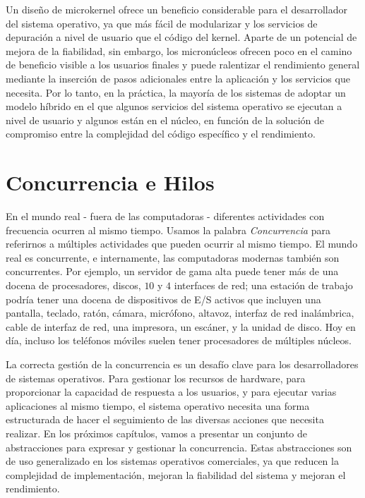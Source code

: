 \documentclass[10pt]{book}
\begin{document}
Un diseño de microkernel ofrece un beneficio considerable para el desarrollador del sistema operativo, ya que más fácil de modularizar y los servicios de depuración a nivel de usuario que el código del kernel. Aparte de un potencial de mejora de la fiabilidad, sin embargo, los micronúcleos ofrecen poco en el camino de beneficio visible a los usuarios finales y puede ralentizar el rendimiento general mediante la inserción de pasos adicionales entre la aplicación y los servicios que necesita. Por lo tanto, en la práctica, la mayoría de los sistemas de adoptar un modelo híbrido en el que algunos servicios del sistema operativo se ejecutan a nivel de usuario y algunos están en el núcleo, en función de la solución de compromiso entre la complejidad del código específico y el rendimiento.

\chapter{Concurrencia e Hilos}
En el mundo real - fuera de las computadoras - diferentes actividades con frecuencia ocurren al mismo tiempo. Usamos la palabra \textit{Concurrencia} para referirnos a múltiples actividades que pueden ocurrir al mismo tiempo. El mundo real es concurrente, e internamente, las computadoras modernas también son concurrentes. Por ejemplo, un servidor de gama alta puede tener más de una docena de procesadores, discos, $10$ y $4$ interfaces de red; una estación de trabajo podría tener una docena de dispositivos de E/S activos que incluyen una pantalla, teclado, ratón, cámara, micrófono, altavoz, interfaz de red inalámbrica, cable de interfaz de red, una impresora, un escáner, y la unidad de disco. Hoy en día, incluso los teléfonos móviles suelen tener procesadores de múltiples núcleos.

La correcta gestión de la concurrencia es un desafío clave para los desarrolladores de sistemas operativos. Para gestionar los recursos de hardware, para proporcionar la capacidad de respuesta a los usuarios, y para ejecutar varias aplicaciones al mismo tiempo, el sistema operativo necesita una forma estructurada de hacer el seguimiento de las diversas acciones que necesita realizar. En los próximos capítulos, vamos a presentar un conjunto de abstracciones para expresar y gestionar la concurrencia. Estas abstracciones son de uso generalizado en los sistemas operativos comerciales, ya que reducen la complejidad de implementación, mejoran la fiabilidad del sistema y mejoran el rendimiento.
\end{document}
